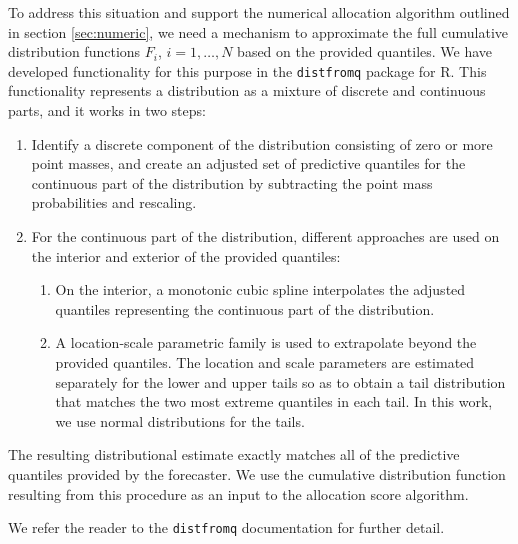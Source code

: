 \documentclass{article}
\begin{document}
To address this situation and support the numerical allocation algorithm outlined in section \ref{sec:numeric}, we need a mechanism to approximate the full cumulative distribution functions $F_i$, $i = 1, \ldots, N$ based on the provided quantiles. We have developed functionality for this purpose in the \verb`distfromq` package for R.\citep{ray-distfromq} This functionality represents a distribution as a mixture of discrete and continuous parts, and it works in two steps:
\begin{enumerate}
  \item Identify a discrete component of the distribution consisting of zero or more point masses, and create an adjusted set of predictive quantiles for the continuous part of the distribution by subtracting the point mass probabilities and rescaling.
  \item For the continuous part of the distribution, different approaches are used on the interior and exterior of the provided quantiles:
  \begin{enumerate}
    \item On the interior, a monotonic cubic spline interpolates the adjusted quantiles representing the continuous part of the distribution.
    \item A location-scale parametric family is used to extrapolate beyond the provided quantiles. The location and scale parameters are estimated separately for the lower and upper tails so as to obtain a tail distribution that matches the two most extreme quantiles in each tail. In this work, we use normal distributions for the tails.
  \end{enumerate}
\end{enumerate}
The resulting distributional estimate exactly matches all of the predictive quantiles provided by the forecaster. We use the cumulative distribution function resulting from this procedure as an input to the allocation score algorithm.

We refer the reader to the \verb`distfromq` documentation for further detail.\citep{ray-distfromq}
\end{document}
